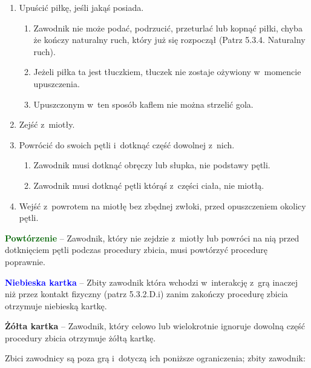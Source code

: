 \documentclass[12pt,a4paper]{article}
\renewcommand{\subsubsection}[1]{
  \oldsubsubsection{#1}%
  \leftskip1.5cm
}
\newcommand\yellowcard[1]{\bgroup\textcolor{darkyellow}{\textbf{#1}}}
\newcommand\bluecard[1]{\bgroup\textcolor{blue}{\textbf{#1}}}
\newcommand\other[1]{\bgroup\textcolor{darkgreen}{\textbf{#1}}}
\begin{document}
\begin{enumerate}
	\item
	      Upuścić piłkę, jeśli jakąś posiada.

	      \begin{enumerate}
		      \item
		            Zawodnik nie może podać, podrzucić, przeturlać lub kopnąć piłki,
		            chyba że kończy naturalny ruch, który już się rozpoczął (Patrz
		            5.3.4. Naturalny ruch).
		      \item
		            Jeżeli piłka ta jest tłuczkiem, tłuczek nie zostaje ożywiony w~momencie upuszczenia.
		      \item
		            Upuszczonym w~ten sposób kaflem nie można strzelić gola.
	      \end{enumerate}
	\item
	      Zejść z~miotły.
	\item
	      Powrócić do swoich pętli i~dotknąć część dowolnej z~nich.

	      \begin{enumerate}
		      \item
		            Zawodnik musi dotknąć obręczy lub słupka, nie podstawy pętli.
		      \item
		            Zawodnik musi dotknąć pętli którąś z~części ciała, nie miotłą.
	      \end{enumerate}
	\item Wejść z~powrotem na miotłę bez zbędnej zwłoki, przed opuszczeniem
	      okolicy pętli.

\end{enumerate}

\other{Powtórzenie} -- Zawodnik, który nie zejdzie z~miotły lub powróci
na nią przed dotknięciem pętli podczas procedury zbicia, musi powtórzyć
procedurę poprawnie.

\bluecard{Niebieska kartka} -- Zbity zawodnik która wchodzi w~interakcję z~grą inaczej
niż przez kontakt fizyczny (patrz 5.3.2.D.i) zanim zakończy procedurę
zbicia otrzymuje niebieską kartkę.

\yellowcard{Żółta kartka} -- Zawodnik, który celowo lub wielokrotnie ignoruje
dowolną część procedury zbicia otrzymuje żółtą kartkę.

\subsubsection{Zbici zawodnicy}

Zbici zawodnicy są poza grą i~dotyczą ich poniższe ograniczenia; zbity
zawodnik:
\end{document}

